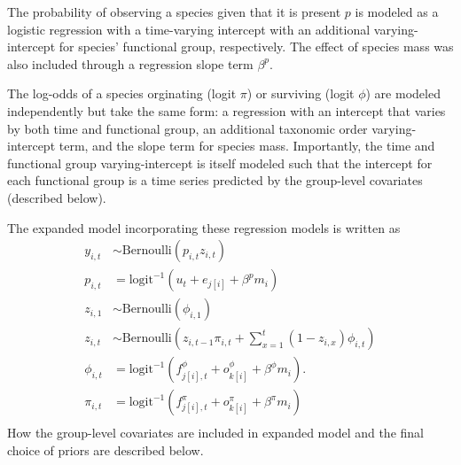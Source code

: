 \documentclass[12pt,letterpaper]{article}
\begin{document}
The probability of observing a species given that it is present \(p\) is modeled as a logistic regression with a time-varying intercept with an additional varying-intercept for species' functional group, respectively. The effect of species mass was also included through a regression slope term \(\beta^{p}\).

The log-odds of a species orginating (logit \(\pi\)) or surviving (logit \(\phi\)) are modeled independently but take the same form: a regression with an intercept that varies by both time and functional group, an additional taxonomic order varying-intercept term, and the slope term for species mass. Importantly, the time and functional group varying-intercept is itself modeled such that the intercept for each functional group is a time series predicted by the group-level covariates (described below). 

The expanded model incorporating these regression models is written as
\begin{equation}
  \begin{aligned}
    y_{i, t} &\sim \text{Bernoulli}(p_{i, t} z_{i, t}) \\
    p_{i, t} &= \text{logit}^{-1}(u_{t} + e_{j[i]} + \beta^{p} m_{i}) \\
    z_{i, 1} &\sim \text{Bernoulli}(\phi_{i, 1}) \\
    z_{i, t} &\sim \text{Bernoulli}\left(z_{i, t - 1} \pi_{i,t} + \sum_{x = 1}^{t}(1 - z_{i, x}) \phi_{i,t}\right) \\
    \phi_{i, t} &= \text{logit}^{-1}(f^{\phi}_{j[i], t} + o^{\phi}_{k[i]} + \beta^{\phi} m_{i}). \\
    \pi_{i, t} &= \text{logit}^{-1}(f^{\pi}_{j[i], t} + o^{\pi}_{k[i]} + \beta^{\pi} m_{i}) \\
  \end{aligned}
  \label{eq:expanded}
\end{equation}
How the group-level covariates are included in expanded model and the final choice of priors are described below.
\end{document}
